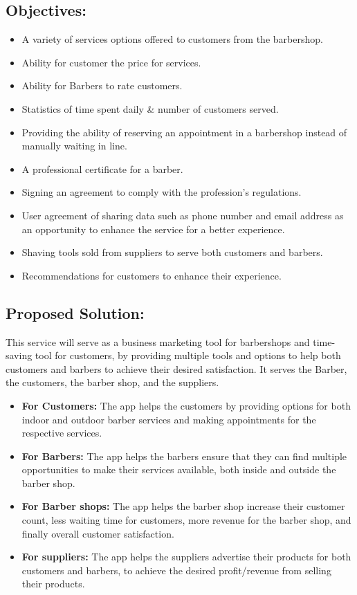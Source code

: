 \documentclass{article}
\begin{document}
      \subsection{Objectives:}
      \begin{itemize}
        \item A variety of services options offered to customers from the barbershop.
        \item Ability for customer the price for services.
        \item Ability for Barbers to rate customers.
        \item Statistics of time spent daily \& number of customers served.
        \item Providing the ability of reserving an appointment in a barbershop instead of manually waiting in line.
        \item A professional certificate for a barber.
        \item Signing an agreement to comply with the profession's regulations.
        \item User agreement of sharing data such as phone number and email address as an opportunity to enhance the service for a better experience.
        \item Shaving tools sold from suppliers to serve both customers and barbers.
        \item  Recommendations for customers to enhance their experience.  
      \end{itemize}
      \subsection{Proposed Solution:}
      This service will serve as a business marketing tool for barbershops and time-saving tool for customers, by providing multiple tools and options to help both customers and barbers to achieve their desired satisfaction. It serves the Barber, the customers, the barber shop, and the suppliers.
      \begin{itemize}
        \item \textbf{For Customers:} The app helps the customers by providing options for both indoor and outdoor barber services and making appointments for the respective services.
        \item \textbf{For Barbers:} The app helps the barbers ensure that they can find multiple opportunities to make their services available, both inside and outside the barber shop.
        \item \textbf{For Barber shops:} The app helps the barber shop increase their customer count, less waiting time for customers, more revenue for the barber shop, and finally overall customer satisfaction.
        \item \textbf{For suppliers:} The app helps the suppliers advertise their products for both customers and barbers, to achieve the desired profit/revenue from selling their products.           
      \end{itemize}
\end{document}
